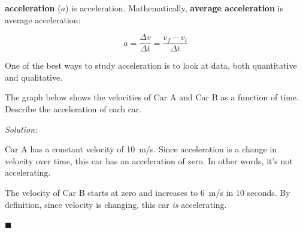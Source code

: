 \documentclass[dvipsnames]{article}
\begin{document}
\textbf{\Gls{acceleration}} ($a$) is \glsdesc{acceleration}. Mathematically, \textbf{\gls{average acceleration}} is \gls{average acceleration}:

\begin{equation*}
    a = \frac{\Delta v}{\Delta t} = \frac{v_f - v_i}{\Delta t}
\end{equation*}

One of the best ways to study acceleration is to look at data, both quantitative and qualitative. 

\begin{example}
The graph below shows the velocities of Car A and Car B as a function of time. Describe the acceleration of each car.

\begin{center}
\end{center}
\end{example}

\textit{Solution:}

Car A has a constant velocity of \SI{10}{m/s}. Since acceleration is a change in velocity over time, this car has an acceleration of zero. In other words, it's not accelerating.

The velocity of Car B starts at zero and increases to \SI{6}{m/s} in 10 seconds. By definition, since velocity is changing, this car \textit{is} accelerating.

\hfill $\blacksquare$
\end{document}
